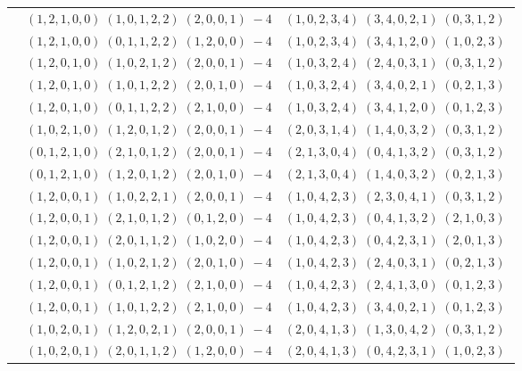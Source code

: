 \documentclass[11pt]{article}
\begin{document}
\begin{longtable}[l]{|c|c|c|}
 \cline{2-3} 
 & $(1 ,2 ,1 ,0 ,0) \;(1 ,0 ,1 ,2 ,2) \;(2 ,0 ,0 ,1) \;-4$ & $(1 ,0 ,2 ,3 ,4) \;(3 ,4 ,0 ,2 ,1) \;(0 ,3 ,1 ,2) \;$\\ 
 \cline{2-3} 
 & $(1 ,2 ,1 ,0 ,0) \;(0 ,1 ,1 ,2 ,2) \;(1 ,2 ,0 ,0) \;-4$ & $(1 ,0 ,2 ,3 ,4) \;(3 ,4 ,1 ,2 ,0) \;(1 ,0 ,2 ,3) \;$\\ 
 \cline{2-3} 
 & $(1 ,2 ,0 ,1 ,0) \;(1 ,0 ,2 ,1 ,2) \;(2 ,0 ,0 ,1) \;-4$ & $(1 ,0 ,3 ,2 ,4) \;(2 ,4 ,0 ,3 ,1) \;(0 ,3 ,1 ,2) \;$\\ 
 \cline{2-3} 
 & $(1 ,2 ,0 ,1 ,0) \;(1 ,0 ,1 ,2 ,2) \;(2 ,0 ,1 ,0) \;-4$ & $(1 ,0 ,3 ,2 ,4) \;(3 ,4 ,0 ,2 ,1) \;(0 ,2 ,1 ,3) \;$\\ 
 \cline{2-3} 
 & $(1 ,2 ,0 ,1 ,0) \;(0 ,1 ,1 ,2 ,2) \;(2 ,1 ,0 ,0) \;-4$ & $(1 ,0 ,3 ,2 ,4) \;(3 ,4 ,1 ,2 ,0) \;(0 ,1 ,2 ,3) \;$\\ 
 \cline{2-3} 
 & $(1 ,0 ,2 ,1 ,0) \;(1 ,2 ,0 ,1 ,2) \;(2 ,0 ,0 ,1) \;-4$ & $(2 ,0 ,3 ,1 ,4) \;(1 ,4 ,0 ,3 ,2) \;(0 ,3 ,1 ,2) \;$\\ 
 \cline{2-3} 
 & $(0 ,1 ,2 ,1 ,0) \;(2 ,1 ,0 ,1 ,2) \;(2 ,0 ,0 ,1) \;-4$ & $(2 ,1 ,3 ,0 ,4) \;(0 ,4 ,1 ,3 ,2) \;(0 ,3 ,1 ,2) \;$\\ 
 \cline{2-3} 
 & $(0 ,1 ,2 ,1 ,0) \;(1 ,2 ,0 ,1 ,2) \;(2 ,0 ,1 ,0) \;-4$ & $(2 ,1 ,3 ,0 ,4) \;(1 ,4 ,0 ,3 ,2) \;(0 ,2 ,1 ,3) \;$\\ 
 \cline{2-3} 
 & $(1 ,2 ,0 ,0 ,1) \;(1 ,0 ,2 ,2 ,1) \;(2 ,0 ,0 ,1) \;-4$ & $(1 ,0 ,4 ,2 ,3) \;(2 ,3 ,0 ,4 ,1) \;(0 ,3 ,1 ,2) \;$\\ 
 \cline{2-3} 
 & $(1 ,2 ,0 ,0 ,1) \;(2 ,1 ,0 ,1 ,2) \;(0 ,1 ,2 ,0) \;-4$ & $(1 ,0 ,4 ,2 ,3) \;(0 ,4 ,1 ,3 ,2) \;(2 ,1 ,0 ,3) \;$\\ 
 \cline{2-3} 
 & $(1 ,2 ,0 ,0 ,1) \;(2 ,0 ,1 ,1 ,2) \;(1 ,0 ,2 ,0) \;-4$ & $(1 ,0 ,4 ,2 ,3) \;(0 ,4 ,2 ,3 ,1) \;(2 ,0 ,1 ,3) \;$\\ 
 \cline{2-3} 
 & $(1 ,2 ,0 ,0 ,1) \;(1 ,0 ,2 ,1 ,2) \;(2 ,0 ,1 ,0) \;-4$ & $(1 ,0 ,4 ,2 ,3) \;(2 ,4 ,0 ,3 ,1) \;(0 ,2 ,1 ,3) \;$\\ 
 \cline{2-3} 
 & $(1 ,2 ,0 ,0 ,1) \;(0 ,1 ,2 ,1 ,2) \;(2 ,1 ,0 ,0) \;-4$ & $(1 ,0 ,4 ,2 ,3) \;(2 ,4 ,1 ,3 ,0) \;(0 ,1 ,2 ,3) \;$\\ 
 \cline{2-3} 
 & $(1 ,2 ,0 ,0 ,1) \;(1 ,0 ,1 ,2 ,2) \;(2 ,1 ,0 ,0) \;-4$ & $(1 ,0 ,4 ,2 ,3) \;(3 ,4 ,0 ,2 ,1) \;(0 ,1 ,2 ,3) \;$\\ 
 \cline{2-3} 
 & $(1 ,0 ,2 ,0 ,1) \;(1 ,2 ,0 ,2 ,1) \;(2 ,0 ,0 ,1) \;-4$ & $(2 ,0 ,4 ,1 ,3) \;(1 ,3 ,0 ,4 ,2) \;(0 ,3 ,1 ,2) \;$\\ 
 \cline{2-3} 
 & $(1 ,0 ,2 ,0 ,1) \;(2 ,0 ,1 ,1 ,2) \;(1 ,2 ,0 ,0) \;-4$ & $(2 ,0 ,4 ,1 ,3) \;(0 ,4 ,2 ,3 ,1) \;(1 ,0 ,2 ,3) \;$\\ 

\end{longtable}
\end{document}
